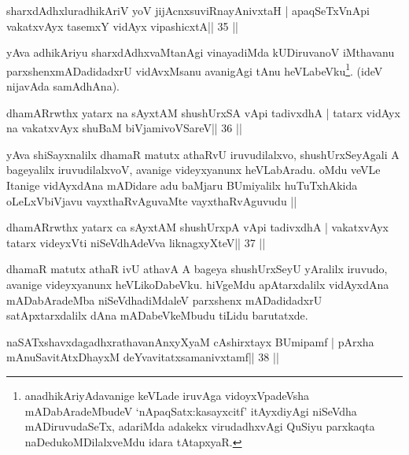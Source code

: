 \begin{shl}
sharxdAdhxluradhikAriV yoV jijAcnxsuviRnayAnivxtaH |
apaqSeTxVnApi vakatxvAyx tasemxY vidAyx vipashicxtA\hfill || 35 ||
\end{shl}

\begin{artha}
yAva adhikAriyu sharxdAdhxvaMtanAgi vinayadiMda kUDiruvanoV iMtha\-vanu  parxshenxmADadidadxrU vidAvxMsanu avanigAgi tAnu heVLabeVku\footnote[5]{anadhikAriyAdavanige keVLade iruvAga vidoyxVpadeVsha mADabAradeMbudeV `nApaqSatx:kasayxcitf' itAyxdiyAgi niSeVdha mADiruvudaSeTx, adariMda adakekx virudadhxvAgi QuSiyu parxkaqta naDedukoMDilalxveMdu idara tAtapxyaR.}. (ideV nijavAda samAdhAna).
\end{artha}


\begin{shl}
dhamARrwthx yatarx na sAyxtAM shushUrxSA vA\s pi tadivxdhA |
tatarx vidAyx na vakatxvAyx shuBaM biVjamivoVSareV\hfill || 36 ||
\end{shl}

\begin{artha}
yAva shiSayxnalilx dhamaR matutx athaRvU iruvudilalxvo, shushUrxSeyAgali A bageyalilx iruvudilalxvoV, avanige videyxyanunx heVLabAradu. oMdu veVLe Itanige vidAyxdAna mADidare adu baMjaru BUmiyalilx huTuTxhAkida oLeLxVbiVjavu vayxthaRvAguvaMte vayxthaRvAguvudu ||
\end{artha} 
 

\begin{shl}
dhamARrwthx yatarx ca sAyxtAM shushUrxpA vA\s pi tadivxdhA |
vakatxvAyx tatarx videyxVti niSeVdhAdeVva liknagxyXteV\hfill || 37 ||
\end{shl}

\begin{artha}
dhamaR matutx athaR ivU athavA A bageya shushUrxSeyU yAralilx iruvudo,  avanige videyxyanunx heVLikoDabeVku. hiVgeMdu apAtarxdalilx vidAyxdAna mADabAradeMba niSeVdhadiMdaleV parxshenx mADadidadxrU satApxtarxdalilx dAna mADabeVkeMbudu tiLidu barutatxde.
\end{artha}


\begin{shl}
\footnotemark[7]naSATxshavxdagadhxrathavanAnxyXyaM cA\s\s shirxtayx BUmipamf |
pArxha mAnuSavitAtxDhayxM deYvavitatxsamanivxtamf\hfill || 38 ||
\end{shl}

